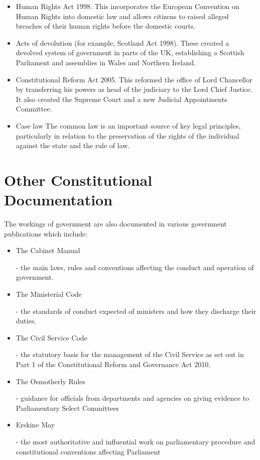 \documentclass[14pt,titlepage]{extarticle}
\begin{document}
\begin{itemize}
\item Human Rights Act 1998. This incorporates the European Convention on Human Rights into domestic law and allows citizens to raised alleged breaches of their human rights before the domestic courts.

\item Acts of devolution (for example, Scotland Act 1998). These created a devolved system of government in parts of the UK, establishing a Scottish Parliament and assemblies in Wales and Northern Ireland.

\item Constitutional Reform Act 2005. This reformed the office of Lord Chancellor by transferring his powers as head of the judiciary to the Lord Chief Justice. It also created the Supreme Court and a new Judicial Appointments Committee.

\item Case law
The common law is an important source of key legal principles, particularly in relation to the preservation of the rights of the individual against the state and the rule of law.
\end{itemize}

\section{Other Constitutional Documentation}

The workings of government are also documented in various government publications which include:

\begin{itemize}
\item The Cabinet Manual \cite{rbjw005}
  
  - the main laws, rules and conventions affecting the conduct and operation of government.

\item The Ministerial Code \cite{rbjw006}

  - the standards of conduct expected of ministers and how they discharge their duties.
  
\item The Civil Service Code \cite{rbjw007}

  - the statutory basis for the management of the Civil Service as set out in Part 1 of the Constitutional Reform and Governance Act 2010.

\item The Osmotherly Rules \cite{rbjw008}
  
  - guidance for officials from departments and agencies on giving evidence to Parliamentary Select Committees
\item Erskine May \cite{rbjw009,rbjw010}

  - the most authoritative and influential work on parliamentary procedure and constitutional conventions affecting Parliament
\end{itemize}
\end{document}
